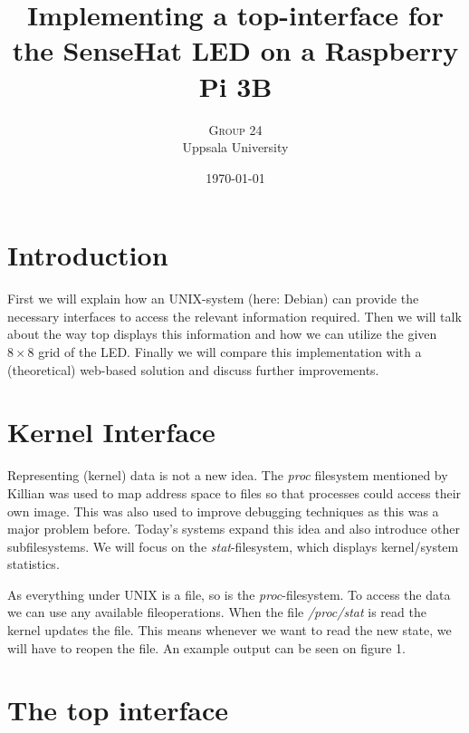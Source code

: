 \documentclass[twoside,twocolumn]{article}
\title{Implementing a top-interface for the SenseHat LED on a Raspberry Pi 3B} %
\author{%
\textsc{Group 24} \\[1ex] %
\normalsize Uppsala University \\ %
}
\date{\today} %
\begin{document}
\maketitle


\section{Introduction}

First we will explain how an UNIX-system (here: Debian) can provide the 
necessary interfaces to access the relevant information required. Then we will 
talk about the way top displays this information and how we can utilize the 
given $8\times8$ grid of the LED. Finally we will compare this implementation
with a (theoretical) web-based solution and discuss further improvements. 


\section{Kernel Interface}

Representing (kernel) data is not a new idea. The \textit{proc} filesystem 
mentioned by Killian\cite{Killian:1984} was used to map address space to files 
so that processes could access their own image. This was also used to improve 
debugging techniques as this was a major problem before. Today's systems expand 
this idea and also introduce other subfilesystems\cite{proc(5)}. We will focus 
on the \textit{stat}-filesystem, which displays kernel/system statistics.

As everything under UNIX is a file, so is the \textit{proc}-filesystem. To
access the data we can use any available fileoperations. When the file
\textit{/proc/stat} is read the kernel updates the file. This means whenever we
want to read the new state, we will have to reopen the file. An example output
can be seen on figure 1. %


\section{The top interface}
\end{document}
